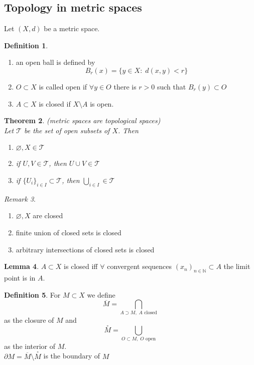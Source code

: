 \documentclass[a4paper, 12pt]{article}
\theoremstyle{plain}
\newtheorem{theorem}{Theorem}[subsection] %
\theoremstyle{definition}
\newtheorem{definition}[theorem]{Definition} %
\theoremstyle{lemma}
\newtheorem{lemma}[theorem]{Lemma}
\theoremstyle{remark}
\newtheorem{remark}[theorem]{Remark}
\theoremstyle{corollary}
\theoremstyle{example}
\begin{document}
	\subsection{Topology in metric spaces}
	Let $(X,d)$ be a metric space.
	\begin{definition}
		\begin{enumerate}
			\item an open ball is defined by \[B_r(x) = \{y \in X: \; d(x,y) < r\}\]
			\item $O \subset X$ is called open if $\forall y \in O$ there is $r > 0$ such that $B_r(y) \subset O$
			\item $A \subset X$ is closed if $X \setminus A$ is open.
		\end{enumerate}
	\end{definition}

	\begin{theorem} (metric spaces are topological spaces)\\
		Let $\mathcal{T}$ be the set of open subsets of $X$. Then \begin{enumerate}
			\item $\varnothing, X \in \mathcal{T}$
			\item if $U,V \in \mathcal{T}$, then $U \cup V \in \mathcal{T}$
			\item if $\{U_i\}_{i \in I} \subset \mathcal{T}$, then $\bigcup_{i \in I} \in \mathcal{T}$
		\end{enumerate}
	\end{theorem}

	\begin{remark}
		\begin{enumerate}
			\item $\varnothing, X$ are closed
			\item finite union of closed sets is closed
			\item arbitrary intersections of closed sets is closed
		\end{enumerate}
	\end{remark}

	\begin{lemma}
		$A \subset X$ is closed iff $\forall$ convergent sequences $(x_n)_{n \in \mathbb{N}} \subset A$ the limit point is in $A$.
	\end{lemma}

	\begin{definition}
		For $M \subset X$ we define \[\overline{M} = \bigcap\limits_{A \supset M, \; A \text{ closed}}\] as the closure of $M$ and \[\overset{°}{M} = \bigcup\limits_{O \subset M, \; O \text{ open}}\] as the interior of $M$.\\
		$\partial M = \overline{M} \setminus \overset{°}{M}$ is the boundary of $M$
	\end{definition}
\end{document}
